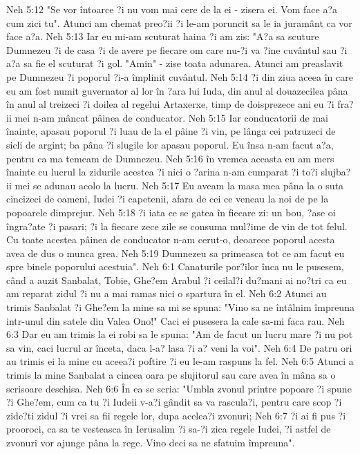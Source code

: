 Neh 5:12  "Se vor întoarce ?i nu vom mai cere de la ei - zisera ei. Vom face a?a cum zici tu". Atunci am chemat preo?ii ?i le-am poruncit sa le ia juramânt ca vor face a?a.
Neh 5:13  Iar eu mi-am scuturat haina ?i am zis: "A?a sa scuture Dumnezeu ?i de casa ?i de avere pe fiecare om care nu-?i va ?ine cuvântul sau ?i a?a sa fie el scuturat ?i gol. "Amin" - zise toata adunarea. Atunci am preaslavit pe Dumnezeu ?i poporul ?i-a împlinit cuvântul.
Neh 5:14  ?i din ziua aceea în care eu am fost numit guvernator al lor în ?ara lui Iuda, din anul al douazecilea pâna în anul al treizeci ?i doilea al regelui Artaxerxe, timp de doisprezece ani eu ?i fra?ii mei n-am mâncat pâinea de conducator.
Neh 5:15  Iar conducatorii de mai înainte, apasau poporul ?i luau de la el pâine ?i vin, pe lânga cei patruzeci de sicli de argint; ba pâna ?i slugile lor apasau poporul. Eu însa n-am facut a?a, pentru ca ma temeam de Dumnezeu.
Neh 5:16  în vremea aceasta eu am mers înainte cu lucrul la zidurile acestea ?i nici o ?arina n-am cumparat ?i to?i slujba?ii mei se adunau acolo la lucru.
Neh 5:17  Eu aveam la masa mea pâna la o suta cincizeci de oameni, Iudei ?i capetenii, afara de cei ce veneau la noi de pe la popoarele dimprejur.
Neh 5:18  ?i iata ce se gatea în fiecare zi: un bou, ?ase oi îngra?ate ?i pasari; ?i la fiecare zece zile se consuma mul?ime de vin de tot felul. Cu toate acestea pâinea de conducator n-am cerut-o, deoarece poporul acesta avea de dus o munca grea.
Neh 5:19  Dumnezeu sa primeasca tot ce am facut eu spre binele poporului acestuia".
Neh 6:1  Canaturile por?ilor înca nu le pusesem, când a auzit Sanbalat, Tobie, Ghe?em Arabul ?i ceilal?i du?mani ai no?tri ca eu am reparat zidul ?i nu a mai ramas nici o spartura în el.
Neh 6:2  Atunci au trimis Sanbalat ?i Ghe?em la mine sa mi se spuna: "Vino sa ne întâlnim împreuna intr-unul din satele din Valea Ono!" Caci ei pusesera la cale sa-mi faca rau.
Neh 6:3  Dar eu am trimis la ei robi sa le spuna: "Am de facut un lucru mare ?i nu pot sa vin, caci lucrul ar înceta, daca l-a? lasa ?i a? veni la voi".
Neh 6:4  De patru ori au trimis ei la mine cu aceea?i poftire ?i eu le-am raspuns la fel.
Neh 6:5  Atunci a trimis la mine Sanbalat a cincea oara pe slujitorul sau care avea în mâna sa o scrisoare deschisa.
Neh 6:6  În ea se scria: "Umbla zvonul printre popoare ?i spune ?i Ghe?em, cum ca tu ?i Iudeii v-a?i gândit sa va rascula?i, pentru care scop ?i zide?ti zidul ?i vrei sa fii regele lor, dupa acelea?i zvonuri;
Neh 6:7  ?i ai fi pus ?i prooroci, ca sa te vesteasca în Ierusalim ?i sa-?i zica regele Iudei, ?i astfel de zvonuri vor ajunge pâna la rege. Vino deci sa ne sfatuim împreuna".
